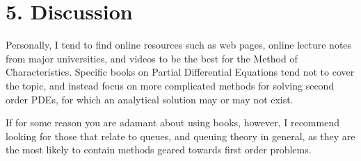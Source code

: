 \documentclass[11pt]{article}
\begin{document}
\section*{5. Discussion}
Personally, I tend to find online resources such as web pages, online lecture notes from major universities, and videos to be the best for the Method of Characteristics. Specific books on Partial Differential Equations tend not to cover the topic, and instead focus on more complicated methods for solving second order PDEs, for which an analytical solution may or may not exist. 

If for some reason you are adamant about using books, however, I recommend looking for those that relate to queues, and queuing theory in general, as they are the most likely to contain methods geared towards first order problems. 
\end{document}
